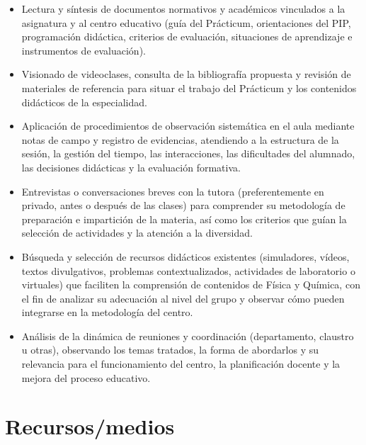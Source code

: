 \documentclass[12pt,a4paper]{article}
\begin{document}
\begin{itemize}
  \item Lectura y síntesis de documentos normativos y académicos vinculados a la asignatura y al centro educativo (guía del Prácticum, orientaciones del PIP, programación didáctica, criterios de evaluación, situaciones de aprendizaje e instrumentos de evaluación).
  
  \item Visionado de videoclases, consulta de la bibliografía propuesta y revisión de materiales de referencia para situar el trabajo del Prácticum y los contenidos didácticos de la especialidad.

  \item Aplicación de procedimientos de observación sistemática en el aula mediante notas de campo y registro de evidencias, atendiendo a la estructura de la sesión, la gestión del tiempo, las interacciones, las dificultades del alumnado, las decisiones didácticas y la evaluación formativa.

  \item Entrevistas o conversaciones breves con la tutora (preferentemente en privado, antes o después de las clases) para comprender su metodología de preparación e impartición de la materia, así como los criterios que guían la selección de actividades y la atención a la diversidad.

  \item Búsqueda y selección de recursos didácticos existentes (simuladores, vídeos, textos divulgativos, problemas contextualizados, actividades de laboratorio o virtuales) que faciliten la comprensión de contenidos de Física y Química, con el fin de analizar su adecuación al nivel del grupo y observar cómo pueden integrarse en la metodología del centro.

  \item Análisis de la dinámica de reuniones y coordinación (departamento, claustro u otras), observando los temas tratados, la forma de abordarlos y su relevancia para el funcionamiento del centro, la planificación docente y la mejora del proceso educativo.
\end{itemize}

\section{Recursos/medios}\label{subsec:recursos}
\end{document}
